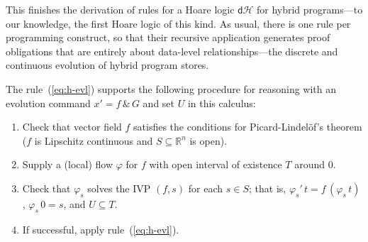 \documentclass[envcountsame,envcountsect]{llncs}
\newcommand{\dH}{\mathsf{d}\mathcal{H}}
\newcommand{\flow}{\varphi}
\newcommand{\reals}{\mathbb{R}}
\begin{document}
This finishes the derivation of rules for a Hoare logic $\dH$ for
hybrid programs---to our knowledge, the first Hoare logic of this
kind. As usual, there is one rule per programming construct, so that
their recursive application generates proof obligations that are
entirely about data-level relationships---the discrete and continuous
evolution of hybrid program stores.

The rule~(\ref{eq:h-evl}) supports the following procedure
for reasoning with an evolution command $x' = f\, \&\, G$ and set $U$
in this calculus:
\begin{enumerate}
\item Check that vector field $f$ satisfies the conditions for
  Picard-Lindel\"of's theorem ($f$ is Lipschitz continuous and
  $S\subseteq\reals^n$ is open).
\item Supply a (local) flow $\flow$ for $f$ with open interval of
  existence $T$ around $0$.
\item Check that $\flow_s$ solves the IVP $(f,s)$ for each $s\in S$;
  that is, $\flow_s'\, t = f\, (\flow_s\, t)$, $\flow_s\, 0 = s$, and
  $U\subseteq T$.
\item If successful, apply rule~(\ref{eq:h-evl}).
\end{enumerate}
\end{document}
